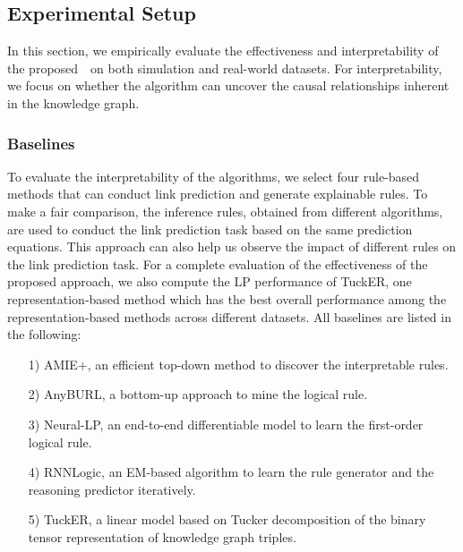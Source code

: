 \subsection{Experimental Setup}
In this section, we empirically evaluate the effectiveness and interpretability of the proposed~\dname~on both
simulation and real-world datasets.
For interpretability, we focus on whether the algorithm can uncover the causal relationships inherent in the knowledge graph.


\subsubsection{\textbf{Baselines}}
To evaluate the interpretability of the algorithms, we select four rule-based methods
that can conduct link prediction and generate explainable rules.
To make a fair comparison, the inference rules, obtained from different algorithms, are used to conduct the link prediction task based on the same prediction equations.
This approach can also help us observe the impact of different rules on the link prediction task.
For a complete evaluation of the effectiveness of the proposed approach, we also compute the LP performance of TuckER\cite{balazevic2019tucker}, one representation-based method which has the best overall performance among the representation-based methods across different datasets\cite{rossi2021knowledge}.
All baselines are listed in the following:
\begin{itemize}
\item[1)] AMIE+\cite{galarraga2015fast}, an efficient  top-down method to discover the interpretable rules.
\item[2)] AnyBURL\cite{meilicke2019anytime}, a bottom-up approach to mine the logical rule.
\item[3)] Neural-LP\cite{yang2017differentiable}, an end-to-end differentiable model to learn the first-order logical rule.
\item[4)] RNNLogic\cite{qu2020rnnlogic}, an EM-based algorithm to learn the rule generator and the reasoning predictor iteratively.
\item[5)] TuckER\cite{balazevic2019tucker},  a linear model based on Tucker
decomposition of the binary tensor representation of knowledge graph triples.
\end{itemize}





